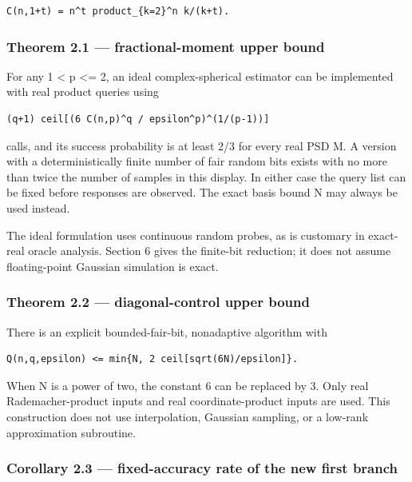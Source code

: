 \documentclass[
  10pt,
]{article}
\begin{document}
\begin{verbatim}
C(n,1+t) = n^t product_{k=2}^n k/(k+t).
\end{verbatim}

\subsubsection{Theorem 2.1 --- fractional-moment upper
bound}\label{theorem-2.1-fractional-moment-upper-bound}

For any 1 \textless{} p \textless= 2, an ideal complex-spherical
estimator can be implemented with real product queries using

\begin{verbatim}
(q+1) ceil[(6 C(n,p)^q / epsilon^p)^(1/(p-1))]
\end{verbatim}

calls, and its success probability is at least 2/3 for every real PSD M.
A version with a deterministically finite number of fair random bits
exists with no more than twice the number of samples in this display. In
either case the query list can be fixed before responses are observed.
The exact basis bound N may always be used instead.

The ideal formulation uses continuous random probes, as is customary in
exact-real oracle analysis. Section 6 gives the finite-bit reduction; it
does not assume floating-point Gaussian simulation is exact.

\subsubsection{Theorem 2.2 --- diagonal-control upper
bound}\label{theorem-2.2-diagonal-control-upper-bound}

There is an explicit bounded-fair-bit, nonadaptive algorithm with

\begin{verbatim}
Q(n,q,epsilon) <= min{N, 2 ceil[sqrt(6N)/epsilon]}.
\end{verbatim}

When N is a power of two, the constant 6 can be replaced by 3. Only real
Rademacher-product inputs and real coordinate-product inputs are used.
This construction does not use interpolation, Gaussian sampling, or a
low-rank approximation subroutine.

\subsubsection{Corollary 2.3 --- fixed-accuracy rate of the new first
branch}\label{corollary-2.3-fixed-accuracy-rate-of-the-new-first-branch}
\end{document}

